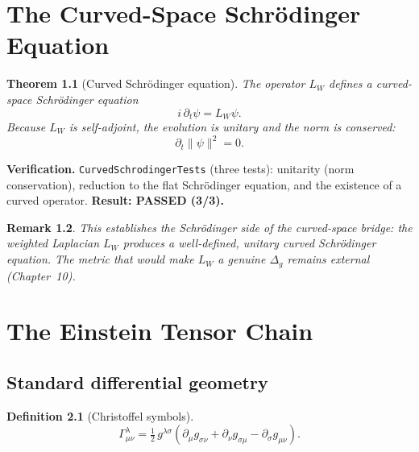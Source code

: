 \documentclass[11pt,twoside]{book}
\newtheorem{theorem}{Theorem}[chapter]
\newtheorem{definition}[theorem]{Definition}
\newtheorem{remark}[theorem]{Remark}
\begin{document}

\chapter{The Curved-Space Schr\"odinger Equation}
\label{ch:curved-schrodinger}

\begin{theorem}[Curved Schr\"odinger equation]
The operator $L_W$ defines a curved-space Schr\"odinger equation
\begin{equation}
i\,\partial_t \psi = L_W \psi .
\end{equation}
Because $L_W$ is self-adjoint, the evolution is unitary and the norm is conserved:
\begin{equation}
\partial_t \|\psi\|^2 = 0 .
\end{equation}
\end{theorem}

\textbf{Verification.} \texttt{CurvedSchrodingerTests} (three tests): unitarity (norm
conservation), reduction to the flat Schr\"odinger equation, and the existence of a
curved operator. \textbf{Result: PASSED (3/3).}

\begin{remark}
This establishes the \emph{Schr\"odinger} side of the curved-space bridge: the weighted
Laplacian $L_W$ produces a well-defined, unitary curved Schr\"odinger equation. The
\emph{metric} that would make $L_W$ a genuine $\Delta_g$ remains external (Chapter~10).
\end{remark}


\chapter{The Einstein Tensor Chain}
\label{ch:einstein-tensor}

\section{Standard differential geometry}

\begin{definition}[Christoffel symbols]
\begin{equation}
\Gamma^\lambda_{\mu\nu} = \tfrac12\, g^{\lambda\sigma}
\left( \partial_\mu g_{\sigma\nu} + \partial_\nu g_{\sigma\mu} - \partial_\sigma g_{\mu\nu} \right).
\end{equation}
\end{definition}
\end{document}
